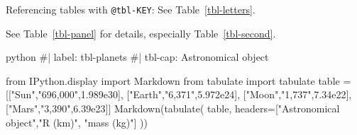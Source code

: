 \documentclass[
  11pt,
  letterpaper,
]{book}
\newenvironment{Shaded}{\begin{snugshade}}{\end{snugshade}}
\newcommand{\CommentTok}[1]{\textcolor[rgb]{0.37,0.37,0.37}{#1}}
\newcommand{\NormalTok}[1]{\textcolor[rgb]{0.00,0.23,0.31}{#1}}
\newcommand{\OtherTok}[1]{\textcolor[rgb]{0.00,0.23,0.31}{#1}}
\begin{document}
Referencing tables with \texttt{@tbl-KEY}: See Table~\ref{tbl-letters}.

\begin{table}

\caption{\label{tbl-panel}Main Caption}

\begin{minipage}{0.50\linewidth}



\end{minipage}%
%
\begin{minipage}{0.50\linewidth}



\end{minipage}%

\end{table}%

See Table~\ref{tbl-panel} for details, especially
Table~\ref{tbl-second}.

\begin{Shaded}
\begin{Highlighting}[]
\NormalTok{python}
\NormalTok{\#| label: tbl{-}planets}
\NormalTok{\#| tbl{-}cap: Astronomical object}

\NormalTok{from IPython.display import Markdown}
\NormalTok{from tabulate import tabulate}
\NormalTok{table = [}\CommentTok{[}\OtherTok{"Sun","696,000",1.989e30}\CommentTok{]}\NormalTok{,}
         \CommentTok{[}\OtherTok{"Earth","6,371",5.972e24}\CommentTok{]}\NormalTok{,}
         \CommentTok{[}\OtherTok{"Moon","1,737",7.34e22}\CommentTok{]}\NormalTok{,}
         \CommentTok{[}\OtherTok{"Mars","3,390",6.39e23}\CommentTok{]}\NormalTok{]}
\NormalTok{Markdown(tabulate(}
\NormalTok{  table, }
\NormalTok{  headers=}\CommentTok{[}\OtherTok{"Astronomical object","R (km)", "mass (kg)"}\CommentTok{]}
\NormalTok{))}
\end{Highlighting}
\end{Shaded}
\end{document}
